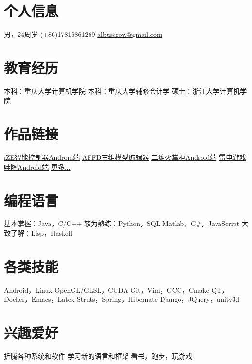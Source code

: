\documentclass[]{friggeri-cv_cn} %
\begin{document}


\begin{aside} %
\section{个人信息}
男，24周岁
(+86)17816861269
\href{mailto:albuscrow@gmail.com}{albuscrow@gmail.com}
\section{教育经历}
本科：重庆大学计算机学院
本科：重庆大学辅修会计学
硕士：浙江大学计算机学院
\section{作品链接}
\href{http://www.hisensehitachi.com/jstx/index.aspx?nodeid=1162}{iZE智能控制器Android端}
\href{https://github.com/albuscrow/AFFD}{AFFD三维模型编辑器}
\href{http://www.jinxizi.cn/android/huozhanggui.html}{二维火掌柜Android端}
\href{https://github.com/albuscrow/learn_unity}{雷电游戏}
\href{http://36kr.com/p/5043478.html}{哇陶Android端}
\href{https://github.com/albuscrow}{更多...}
\section{编程语言}
基本掌握：Java，C/C++
较为熟练：Python，SQL Matlab，C\#，JavaScript
大致了解：Lisp，Haskell
\section{各类技能}
\LARGE{Android}\normalsize{，}\LARGE{Linux}
\large{OpenGL/GLSL}\normalsize{，}\large{CUDA}
\large{Git}\normalsize{，}\large{Vim}\normalsize{，GCC，Cmake}
\normalsize{QT，Docker，Emacs，Latex}
\small{Struts}\normalsize{，}\small{Spring}\normalsize{，}\small{Hibernate}
\small{Django}\normalsize{，}\small{JQuery}\normalsize{，}\small{unity3d}
\section{兴趣爱好}
\normalsize{折腾各种系统和软件
学习新的语言和框架
看书，跑步，玩游戏}
\end{aside}
\end{document}
